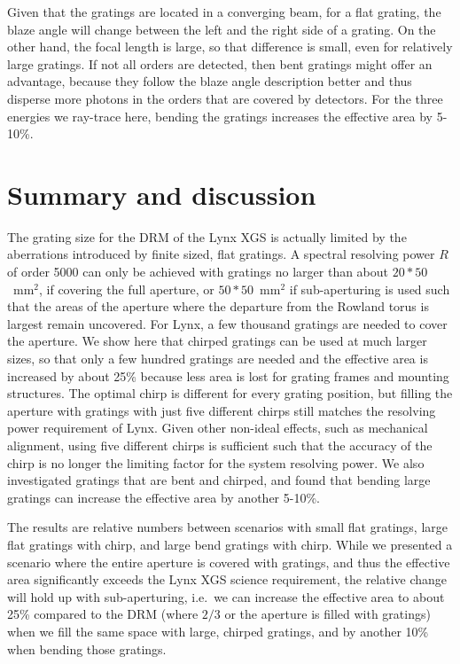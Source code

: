 \documentclass[]{spie}  %
\begin{document}
Given that the gratings are located in a converging beam, for a flat grating, the blaze angle will change between the left and the right side of a grating. On the other hand, the focal length is large, so that difference is small, even for relatively large gratings. If not all orders are detected, then bent gratings might offer an advantage, because they follow the blaze angle description better and thus disperse more photons in the orders that are covered by detectors. For the three energies we ray-trace here, bending the gratings increases the effective area by 5-10\%.




\section{Summary and discussion}
\label{sect:summary}
The grating size for the DRM of the Lynx XGS is actually limited by the aberrations introduced by finite sized, flat gratings. A spectral resolving power $R$ of order 5000 can only be achieved with gratings no larger than about $20 * 50$~mm$^2$, if covering the full aperture, or $50 * 50$~mm$^2$ if sub-aperturing is used such that the areas of the aperture where the departure from the Rowland torus is largest remain uncovered. For Lynx, a few thousand gratings are needed to cover the aperture. We show here that chirped gratings can be used at much larger sizes, so that only a few hundred gratings are needed and the effective area is increased by about 25\% because less area is lost for grating frames and mounting structures. The optimal chirp is different for every grating position, but filling the aperture with gratings with just five different chirps still matches the resolving power requirement of Lynx. Given other non-ideal effects, such as mechanical alignment, using five different chirps is sufficient such that the accuracy of the chirp is no longer the limiting factor for the system resolving power.
We also investigated gratings that are bent and chirped, and found that bending large gratings can increase the effective area by another 5-10\%.

The results are relative numbers between scenarios with small flat gratings, large flat gratings with chirp, and large bend gratings with chirp. While we presented a scenario where the entire aperture is covered with gratings, and thus the effective area significantly exceeds the Lynx XGS science requirement, the relative change will hold up with sub-aperturing, i.e.\ we can increase the effective area to about 25\% compared to the DRM (where $2/3$ or the aperture is filled with gratings) when we fill the same space with large, chirped gratings, and by another 10\% when bending those gratings.
\end{document}
